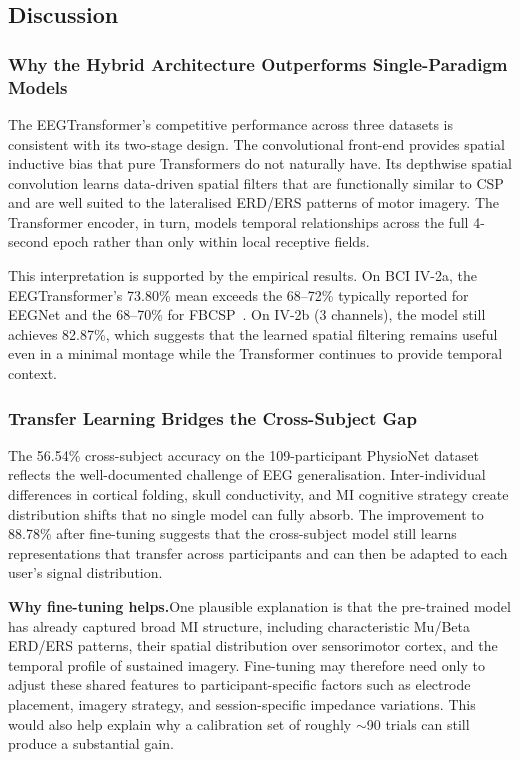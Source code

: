 \documentclass[12pt, a4paper]{article}
\begin{document}
\subsection{Discussion}

\subsubsection{Why the Hybrid Architecture Outperforms Single-Paradigm Models}
\label{sec:disc_hybrid}

The EEGTransformer's competitive performance across three datasets is consistent with its two-stage design. The convolutional front-end provides spatial inductive bias that pure Transformers do not naturally have. Its depthwise spatial convolution learns data-driven spatial filters that are functionally similar to CSP and are well suited to the lateralised ERD/ERS patterns of motor imagery. The Transformer encoder, in turn, models temporal relationships across the full 4-second epoch rather than only within local receptive fields.

This interpretation is supported by the empirical results. On BCI IV-2a, the EEGTransformer's 73.80\% mean exceeds the 68--72\% typically reported for EEGNet and the 68--70\% for FBCSP~\cite{hameed2025enhancing}. On IV-2b (3 channels), the model still achieves 82.87\%, which suggests that the learned spatial filtering remains useful even in a minimal montage while the Transformer continues to provide temporal context.

\subsubsection{Transfer Learning Bridges the Cross-Subject Gap}

The 56.54\% cross-subject accuracy on the 109-participant PhysioNet dataset reflects the well-documented challenge of EEG generalisation. Inter-individual differences in cortical folding, skull conductivity, and MI cognitive strategy create distribution shifts that no single model can fully absorb. The improvement to 88.78\% after fine-tuning suggests that the cross-subject model still learns representations that transfer across participants and can then be adapted to each user's signal distribution.

\textbf{Why fine-tuning helps.}\quad One plausible explanation is that the pre-trained model has already captured broad MI structure, including characteristic Mu/Beta ERD/ERS patterns, their spatial distribution over sensorimotor cortex, and the temporal profile of sustained imagery. Fine-tuning may therefore need only to adjust these shared features to participant-specific factors such as electrode placement, imagery strategy, and session-specific impedance variations. This would also help explain why a calibration set of roughly $\sim$90 trials can still produce a substantial gain.
\end{document}
